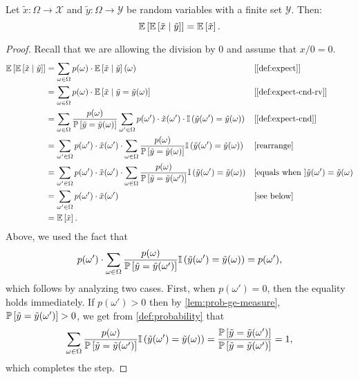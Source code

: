 \begin{theorem} \label{thm:total-expectation}
Let $\tilde{x} \colon \Omega \to \mathcal{X}$ and $\tilde{y} \colon \Omega \to \mathcal{Y}$ be random variables with a finite set $\mathcal{Y}$. Then:
\[
\mathbb{E}\left[\mathbb{E}\left[\tilde{x} \mid  \tilde{y}\right]\right] = \mathbb{E} \left[ \tilde{x} \right].
\]
\end{theorem}
\begin{proof}
Recall that we are allowing the division by 0 and assume that $x / 0 = 0$.
\begin{align*} 
  \E\left[\E\left[\tilde{x} \mid  \tilde{y}\right]\right]
  &= \sum_{\omega \in \Omega }  p (\omega) \cdot  \E \left[ \tilde{x} \mid  \tilde{y} \right](\omega) && \why{\cref{def:expect}}\\
  &= \sum_{\omega \in \Omega }  p (\omega) \cdot  \E \left[ \tilde{x} \mid  \tilde{y}  = \tilde{y}(\omega) \right] && \why{\cref{def:expect-cnd-rv}}\\
  &= \sum_{\omega \in \Omega }  \frac{p(\omega)}{\PP \left[ \tilde{y}= \tilde{y}(\omega)\right]} \sum_{\omega'\in \Omega } p(\omega') \cdot \tilde{x}(\omega') \cdot  \I\left( \tilde{y}(\omega') = \tilde{y}(\omega) \right)   && \why{\cref{def:expect-cnd}} \\
  &=  \sum_{\omega'\in \Omega } p(\omega') \cdot \tilde{x}(\omega') \cdot \sum_{\omega \in \Omega }  \frac{p(\omega)}{\PP \left[ \tilde{y}= \tilde{y}(\omega)\right]} \I\left( \tilde{y}(\omega') = \tilde{y}(\omega) \right)  && \why{rearrange} \\
  &=  \sum_{\omega'\in \Omega } p(\omega') \cdot \tilde{x}(\omega') \cdot \sum_{\omega \in \Omega }  \frac{p(\omega)}{\PP \left[ \tilde{y} = \tilde{y}(\omega')\right]} \I\left( \tilde{y}(\omega') = \tilde{y}(\omega) \right)  && \why{equals when } \tilde{y}(\omega') = \tilde{y}(\omega) \\
  &=  \sum_{\omega'\in \Omega } p(\omega') \cdot \tilde{x}(\omega')    && \why{see below}  \\
  &= \E \left[ \tilde{x} \right].
\end{align*}
Above, we used the fact that
\[
  p(\omega') \cdot \sum_{\omega \in \Omega }  \frac{p(\omega)}{\mathbb{P} \left[ \tilde{y} = \tilde{y}(\omega')\right]} \mathbb{I}\left( \tilde{y}(\omega') = \tilde{y}(\omega) \right) =  p(\omega'),  
\]
which follows by analyzing two cases. First, when $p(\omega') = 0$, then the equality holds immediately. If $p(\omega') > 0$ then by \cref{lem:prob-ge-measure}, $\mathbb{P} \left[ \tilde{y} = \tilde{y}(\omega')\right] > 0$, we get from \cref{def:probability} that
\[
  \sum_{\omega \in \Omega } \frac{p(\omega)}{\mathbb{P} \left[ \tilde{y} = \tilde{y}(\omega')\right]} \mathbb{I}\left( \tilde{y}(\omega') = \tilde{y}(\omega) \right) 
    =
    \frac{\mathbb{P} \left[ \tilde{y} = \tilde{y}(\omega')\right]}{\mathbb{P} \left[ \tilde{y} = \tilde{y}(\omega')\right]}
    = 1,
  \]
  which completes the step.
\end{proof}
